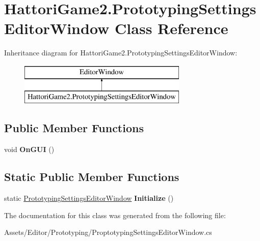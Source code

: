 \hypertarget{class_hattori_game2_1_1_prototyping_settings_editor_window}{}\section{Hattori\+Game2.\+Prototyping\+Settings\+Editor\+Window Class Reference}
\label{class_hattori_game2_1_1_prototyping_settings_editor_window}
Inheritance diagram for Hattori\+Game2.\+Prototyping\+Settings\+Editor\+Window\+:\begin{figure}[H]
\begin{center}
\leavevmode
\includegraphics[height=2.000000cm]{class_hattori_game2_1_1_prototyping_settings_editor_window}
\end{center}
\end{figure}
\subsection*{Public Member Functions}
\begin{DoxyCompactItemize}
\item 
\hypertarget{class_hattori_game2_1_1_prototyping_settings_editor_window_aa260a163489fd28dbbe16eeb53100768}{}void {\bfseries On\+G\+U\+I} ()\label{class_hattori_game2_1_1_prototyping_settings_editor_window_aa260a163489fd28dbbe16eeb53100768}

\end{DoxyCompactItemize}
\subsection*{Static Public Member Functions}
\begin{DoxyCompactItemize}
\item 
\hypertarget{class_hattori_game2_1_1_prototyping_settings_editor_window_a7ed7f5892851e4b043535e9207bf5304}{}static \hyperlink{class_hattori_game2_1_1_prototyping_settings_editor_window}{Prototyping\+Settings\+Editor\+Window} {\bfseries Initialize} ()\label{class_hattori_game2_1_1_prototyping_settings_editor_window_a7ed7f5892851e4b043535e9207bf5304}

\end{DoxyCompactItemize}


The documentation for this class was generated from the following file\+:\begin{DoxyCompactItemize}
\item 
Assets/\+Editor/\+Prototyping/Proptotyping\+Settings\+Editor\+Window.\+cs\end{DoxyCompactItemize}
